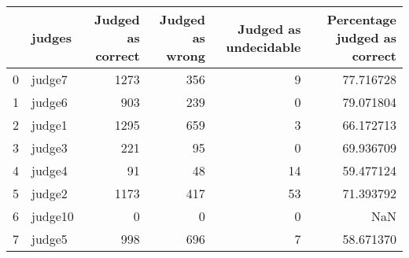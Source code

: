 \begin{tabular}{llrrrr}
\toprule
{} &   judges &  Judged as correct &  Judged as wrong &  Judged as undecidable &  Percentage judged as correct \\
\midrule
0 &   judge7 &               1273 &              356 &                      9 &                     77.716728 \\
1 &   judge6 &                903 &              239 &                      0 &                     79.071804 \\
2 &   judge1 &               1295 &              659 &                      3 &                     66.172713 \\
3 &   judge3 &                221 &               95 &                      0 &                     69.936709 \\
4 &   judge4 &                 91 &               48 &                     14 &                     59.477124 \\
5 &   judge2 &               1173 &              417 &                     53 &                     71.393792 \\
6 &  judge10 &                  0 &                0 &                      0 &                           NaN \\
7 &   judge5 &                998 &              696 &                      7 &                     58.671370 \\
\bottomrule
\end{tabular}
